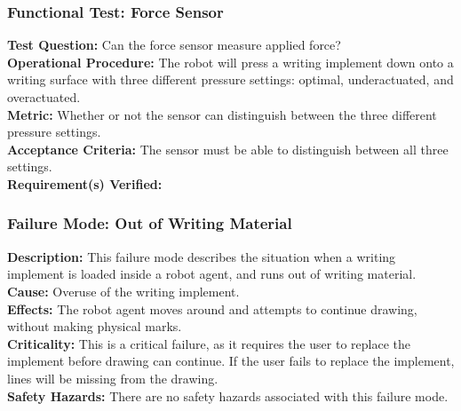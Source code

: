 \subsubsection{Functional Test: Force Sensor}
\label{test:writing_ft_force}
\textbf{Test Question:} Can the force sensor measure applied force? \\
\textbf{Operational Procedure:} The robot will press a writing implement down onto a writing surface with three different pressure settings: optimal, underactuated, and overactuated.\\
\textbf{Metric:} Whether or not the sensor can distinguish between the three different pressure settings. \\
\textbf{Acceptance Criteria:} The sensor must be able to distinguish between all three settings.\\
\textbf{Requirement(s) Verified:} 


\subsubsection{Failure Mode: Out of Writing Material}
\label{sec:writing_fm_ink}
\textbf{Description:} This failure mode describes the situation when a writing implement is loaded inside a robot agent, and runs out of writing material. \\
\textbf{Cause:} Overuse of the writing implement.\\
\textbf{Effects:} The robot agent moves around and attempts to continue drawing, without making physical marks.\\
\textbf{Criticality:} This is a critical failure, as it requires the user to replace the implement before drawing can continue. If the user fails to replace the implement, lines will be missing from the drawing.\\
\textbf{Safety Hazards:} There are no safety hazards associated with this failure mode.\\

